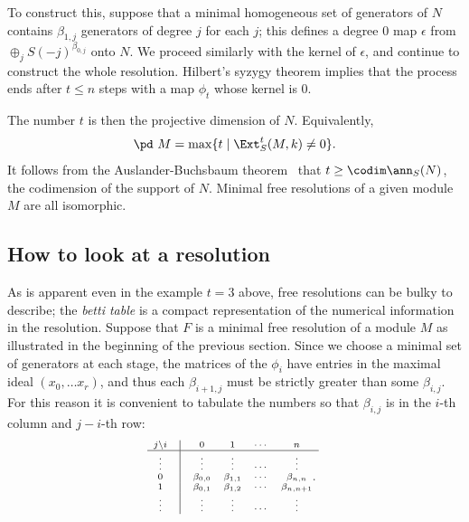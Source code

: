 To construct this, suppose that a minimal homogeneous set of generators of $N$
contains $\beta_{1,j}$ generators of degree $j$ for each $j$; this defines a degree 0 map $\epsilon$
from 
$
\oplus_jS(-j)^{\beta_{0,j}}
$
onto $N$. We proceed similarly with the kernel of $\epsilon$, and continue to construct the whole resolution.
Hilbert's syzygy theorem \cite[***]{Eisenbud1995} implies that the process ends after $t\leq n$ steps with a map $\phi_t$ whose
kernel is 0. 

The number $t$ is then the projective dimension of $N$. 
Equivalently, 
$$
\pd\ M = \max\{t \mid \Ext_S^t(M,k) \neq 0 \}.
$$
It follows from the Auslander-Buchsbaum
theorem~\cite[***]{Eisenbud1995} that $t \geq \codim \ann_S(N)$, the codimension of the support of $N$.
Minimal free resolutions of a given module $M$ are all isomorphic.


\subsection{How to look at a resolution}
As is apparent even in the example $t=3$ above, free resolutions can be bulky to describe; the 
\emph{betti table} is a compact representation of the numerical information in the resolution.
Suppose that 
$F$ is a minimal free resolution of a module $M$ as illustrated in the beginning of the previous section. Since we choose a minimal set of generators at each stage, the matrices of the $\phi_i$ have entries in the maximal
ideal $(x_0,\dots x_r)$, and thus each $\beta_{i+1, j}$ must be strictly greater than some $\beta_{i,j}$. For this reason it
is convenient to tabulate the numbers so that $\beta_{i,j}$ is in the $i$-th column and $j-i$-th row:
$$
\scriptsize{
\begin{matrix} 
j\backslash i&\vline&0   &  1    & \cdots & n    \cr\hline
\vdots&\vline&\vdots&\vdots & \cdots    &\vdots     \cr 
       0&\vline&\beta_{0,0}&\beta_{1,1}&\cdots&\beta_{n,n}\cr
       1&\vline&\beta_{0,1}&\beta_{1,2}&\cdots&\beta_{n,n+1}\cr
\vdots&\vline&\vdots&\vdots & \cdots    &\vdots     \cr 
\end{matrix}.
}
$$         


